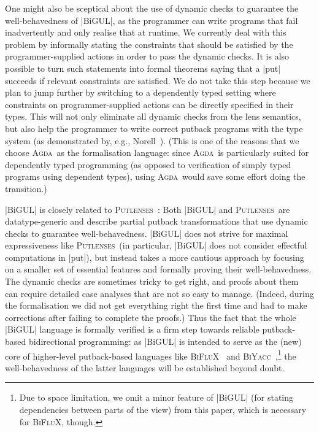 \documentclass[fleqn]{llncs}
\newcommand{\Putlenses}{\textsc{Putlenses}}
\newcommand{\BiFluX}{\textsc{BiFluX}}
\newcommand{\Agda}{\textsc{Agda}}
\newcommand{\BiYacc}{\textsc{BiYacc}}
\begin{document}
One might also be sceptical about the use of dynamic checks to guarantee the well-behavedness of |BiGUL|, as the programmer can write programs that fail inadvertently and only realise that at runtime.
We currently deal with this problem by informally stating the constraints that should be satisfied by the programmer-supplied actions in order to pass the dynamic checks.
It is also possible to turn such statements into formal theorems saying that a |put| succeeds if relevant constraints are satisfied.
We do not take this step because we plan to jump further by switching to a dependently typed setting where constraints on programmer-supplied actions can be directly specified in their types. This will not only eliminate all dynamic checks from the lens semantics, but also help the programmer to write correct putback programs with the type system (as demonstrated by, e.g., Norell~\cite{Norell-interactive-programming}).
(This is one of the reasons that we choose \Agda\ as the formalisation language: since \Agda\ is particularly suited for dependently typed programming (as opposed to verification of simply typed programs using dependent types), using \Agda\ would save some effort doing the transition.)

|BiGUL| is closely related to \Putlenses~\cite{Pacheco-putlenses}:
Both |BiGUL| and \Putlenses\ are datatype-generic and describe partial putback transformations that use dynamic checks to guarantee well-behavedness.
|BiGUL| does not strive for maximal expressiveness like \Putlenses\ (in particular, |BiGUL| does not consider effectful computations in |put|), but instead takes a more cautious approach by focusing on a smaller set of essential features and formally proving their well-behavedness.
The dynamic checks are sometimes tricky to get right, and proofs about them can require detailed case analyses that are not so easy to manage.
(Indeed, during the formalisation we did not get everything right the first time and had to make corrections after failing to complete the proofs.)
Thus the fact that the whole |BiGUL| language is formally verified is a firm step towards reliable putback-based bidirectional programming: as |BiGUL| is intended to serve as the (new) core of higher-level putback-based languages like \BiFluX~\cite{Pacheco-BiFluX} and \BiYacc~\cite{Zhu-BiYacc},\footnote{Due to space limitation, we omit a minor feature of |BiGUL| (for stating dependencies between parts of the view) from this paper, which is necessary for \BiFluX, though.} the well-behavedness of the latter languages will be established beyond doubt.
\end{document}

